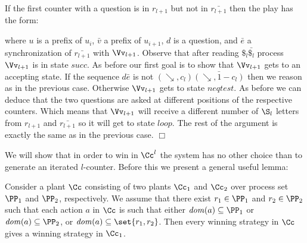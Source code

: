 \documentclass{llncs}
\newcommand{\rlp}{r_{l+1}}
\newcommand{\brlp}{\bar{\rlp}}
\newcommand{\inctest}{\searrow}
\newcommand{\loc}{\mathit{dom}}
\renewenvironment{proof}{{\em Proof. }}{\nopagebreak
  \hspace*{\fill}$\Box$}
\begin{document}
\begin{proof}
  If the first counter with a question is in $\rlp$ but not in $\brlp$
  then the play has the form:
  \begin{center}
  \end{center}
  where $u$ is a prefix of $u_i$, $\bar v$ a prefix of $u_{i+1}$, $d$
  is a question, and $\bar e$ a synchronization of $\brlp$ with
  $\Vv_{l+1}$. Observe that after reading $\$_l\bar{\$_l}$ process $\Vv_{l+1}$ is in
  state $\mathit{succ}$. As before our first goal is to show that $\Vv_{l+1}$
  gets to an accepting state. If the sequence $d\bar e$ is not
  $(\inctest,c_l)\bar{(\inctest,1-c_l)}$ then we reason as in the
  previous case. Otherwise $\Vv_{l+1}$ gets to state $\mathit{neqtest}$. As before we
  can deduce that the two questions are asked at different positions of
  the respective counters. Which means that $\Vv_{l+1}$ will receive a
  different number of $\S_l$ letters from $\rlp$ and $\brlp$ so it
  will get to state $\mathit{loop}$. The rest of the argument is exactly
  the same as in the previous case.
\end{proof}


We will show that in order to win in $\Cc^l$ the system  has no
other choice than to generate an iterated $l$-counter. Before this we
present a  general useful lemma:

\medskip

\begin{lemma}\label{l:sub}
  Consider a plant $\Cc$ consisting of two plants $\Cc_1$ and $\Cc_2$
  over process set $\PP_1$ and $\PP_2$, respectively. We assume that
  there exist $r_1 \in \PP_1$ and $r_2 \in \PP_2$ such that each
  action $a$ in $\Cc$ is such that either $\loc(a) \subseteq \PP_1$ or
  $\loc(a) \subseteq \PP_2$, or $\loc(a) \subseteq
  \set{r_1,r_2}$. Then every winning strategy in $\Cc$ gives a winning
  strategy in $\Cc_1$.
\end{lemma}
\end{document}
